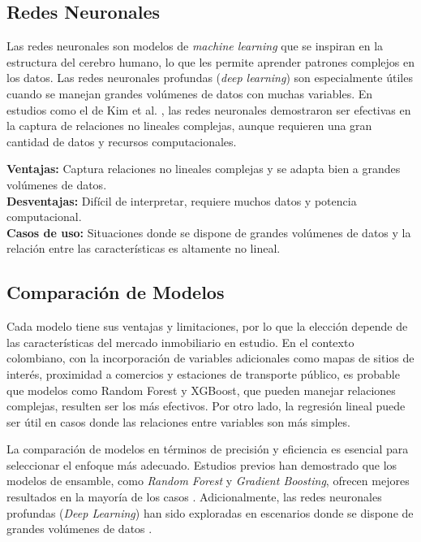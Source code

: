 \subsection*{Redes Neuronales}
Las redes neuronales son modelos de \textit{machine learning} que se inspiran en la estructura del cerebro humano, lo que les permite aprender patrones complejos en los datos. Las redes neuronales profundas (\textit{deep learning}) son especialmente útiles cuando se manejan grandes volúmenes de datos con muchas variables. En estudios como el de Kim et al. \cite{kim2018machinelearning}, las redes neuronales demostraron ser efectivas en la captura de relaciones no lineales complejas, aunque requieren una gran cantidad de datos y recursos computacionales.

\textbf{Ventajas:} Captura relaciones no lineales complejas y se adapta bien a grandes volúmenes de datos.\\
\textbf{Desventajas:} Difícil de interpretar, requiere muchos datos y potencia computacional.\\
\textbf{Casos de uso:} Situaciones donde se dispone de grandes volúmenes de datos y la relación entre las características es altamente no lineal.

\subsection*{Comparación de Modelos}
Cada modelo tiene sus ventajas y limitaciones, por lo que la elección depende de las características del mercado inmobiliario en estudio. En el contexto colombiano, con la incorporación de variables adicionales como mapas de sitios de interés, proximidad a comercios y estaciones de transporte público, es probable que modelos como Random Forest y XGBoost, que pueden manejar relaciones complejas, resulten ser los más efectivos. Por otro lado, la regresión lineal puede ser útil en casos donde las relaciones entre variables son más simples.

La comparación de modelos en términos de precisión y eficiencia es esencial para seleccionar el enfoque más adecuado. Estudios previos han demostrado que los modelos de ensamble, como \textit{Random Forest} y \textit{Gradient Boosting}, ofrecen mejores resultados en la mayoría de los casos \cite{dabreo2021realestate, wang2019svr}. Adicionalmente, las redes neuronales profundas (\textit{Deep Learning}) han sido exploradas en escenarios donde se dispone de grandes volúmenes de datos \cite{mostofi2022realestate}.


